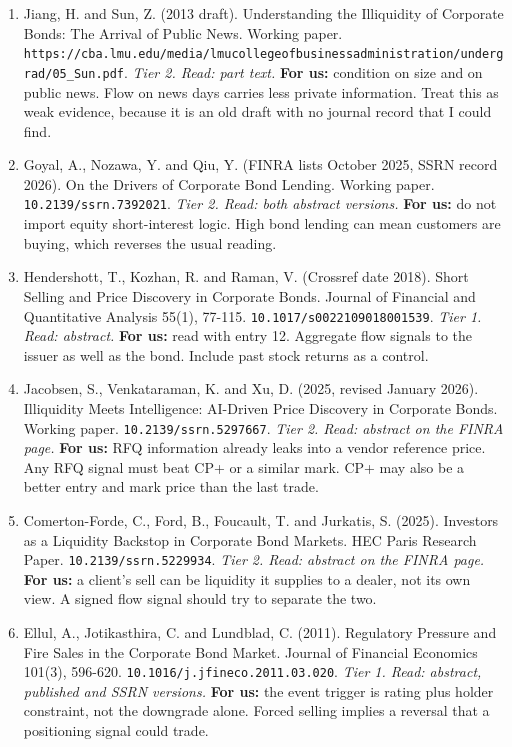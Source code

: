 \begin{enumerate}[leftmargin=*,itemsep=3pt]
\item Jiang, H. and Sun, Z. (2013 draft). Understanding the Illiquidity of Corporate Bonds: The Arrival of Public News. Working paper. \nolinkurl{https://cba.lmu.edu/media/lmucollegeofbusinessadministration/undergrad/05\_Sun.pdf}. \emph{Tier 2. Read: part text.} \textbf{For us:} condition on size and on public news. Flow on news days carries less private information. Treat this as weak evidence, because it is an old draft with no journal record that I could find.
\item Goyal, A., Nozawa, Y. and Qiu, Y. (FINRA lists October 2025, SSRN record 2026). On the Drivers of Corporate Bond Lending. Working paper. \nolinkurl{10.2139/ssrn.7392021}. \emph{Tier 2. Read: both abstract versions.} \textbf{For us:} do not import equity short-interest logic. High bond lending can mean customers are buying, which reverses the usual reading.
\item Hendershott, T., Kozhan, R. and Raman, V. (Crossref date 2018). Short Selling and Price Discovery in Corporate Bonds. Journal of Financial and Quantitative Analysis 55(1), 77-115. \nolinkurl{10.1017/s0022109018001539}. \emph{Tier 1. Read: abstract.} \textbf{For us:} read with entry 12. Aggregate flow signals to the issuer as well as the bond. Include past stock returns as a control.
\item Jacobsen, S., Venkataraman, K. and Xu, D. (2025, revised January 2026). Illiquidity Meets Intelligence: AI-Driven Price Discovery in Corporate Bonds. Working paper. \nolinkurl{10.2139/ssrn.5297667}. \emph{Tier 2. Read: abstract on the FINRA page.} \textbf{For us:} RFQ information already leaks into a vendor reference price. Any RFQ signal must beat CP+ or a similar mark. CP+ may also be a better entry and mark price than the last trade.
\item Comerton-Forde, C., Ford, B., Foucault, T. and Jurkatis, S. (2025). Investors as a Liquidity Backstop in Corporate Bond Markets. HEC Paris Research Paper. \nolinkurl{10.2139/ssrn.5229934}. \emph{Tier 2. Read: abstract on the FINRA page.} \textbf{For us:} a client's sell can be liquidity it supplies to a dealer, not its own view. A signed flow signal should try to separate the two.
\item Ellul, A., Jotikasthira, C. and Lundblad, C. (2011). Regulatory Pressure and Fire Sales in the Corporate Bond Market. Journal of Financial Economics 101(3), 596-620. \nolinkurl{10.1016/j.jfineco.2011.03.020}. \emph{Tier 1. Read: abstract, published and SSRN versions.} \textbf{For us:} the event trigger is rating plus holder constraint, not the downgrade alone. Forced selling implies a reversal that a positioning signal could trade.

\end{enumerate}
